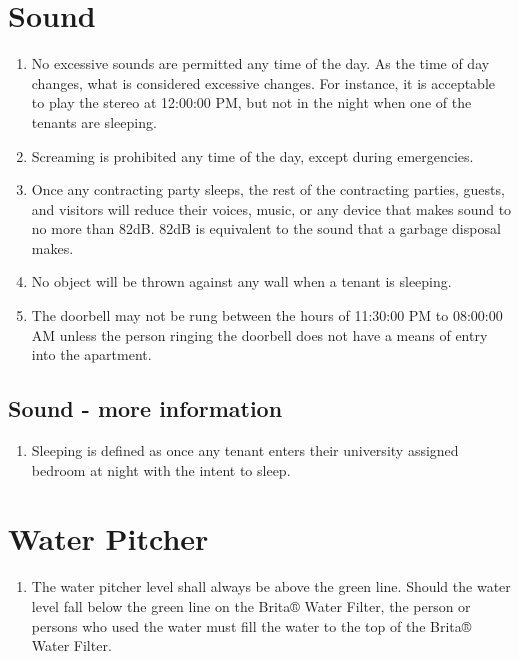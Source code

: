 \documentclass[10pt]{article}
\begin{document}
\section{Sound}
\begin{enumerate}
	\item No excessive sounds are permitted any time of the day. As the time of day changes, what is considered excessive changes. For instance, it is acceptable to play the stereo at 12:00:00 PM, but not in the night when one of the tenants are sleeping.
	\item Screaming is prohibited any time of the day, except during emergencies.
	\item Once any contracting party sleeps, the rest of the contracting parties, guests, and visitors will reduce their voices, music, or any device that makes sound to no more than 82dB. 82dB is equivalent to the sound that a garbage disposal makes.
	\item No object will be thrown against any wall when a tenant is sleeping.
	\item The doorbell may not be rung between the hours of 11:30:00 PM to 08:00:00 AM unless the person ringing the doorbell does not have a means of entry into the apartment.
	
\end{enumerate}
\subsection{Sound - more information}
\begin{enumerate}
	\item Sleeping is defined as once any tenant enters their university assigned bedroom at night with the intent to sleep.
\end{enumerate}
\section{Water Pitcher}
\begin{enumerate}
	\item The water pitcher level shall always be above the green line. Should the water level fall below the green line on the Brita® Water Filter, the person or persons who used the water must fill the water to the top of the Brita® Water Filter.
\end{enumerate}
\end{document}
